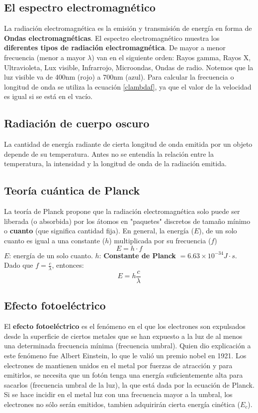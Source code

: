 \documentclass{article}
\begin{document}
\subsection{El espectro electromagnético}
La radiación electromagnética es la emisión y transmisión de energía en forma de \textbf{Ondas electromagnéticas}. El espectro electromagnético muestra los \textbf{diferentes tipos de radiación electromagnética}.
De mayor a menor frecuencia (menor a mayor $\lambda$) van en el siguiente orden: Rayos gamma, Rayos X, Ultravioleta, Lux visible, Infrarrojo, Microondas, Ondas de radio.
Notemos que la luz visible va de 400nm (rojo) a 700nm (azul).
Para calcular la frecuencia o longitud de onda se utiliza la ecuación \ref{clambdaf}, ya que el valor de la velocidad es igual si se está en el vacío.


\subsection{Radiación de cuerpo oscuro}
La cantidad de energía radiante de cierta longitud de onda emitida por un objeto depende de su temperatura. Antes no se entendía la relación entre la temperatura, la intensidad y la longitud de onda de la radiación emitida.

\subsection{Teoría cuántica de Planck}
La teoría de Planck propone que la radiación electromagnética solo puede ser liberada (o absorbida) por los átomos en "paquetes" discretos de tamaño mínimo o \textbf{cuanto} (que significa cantidad fija).
En general, la energía ($E$), de un solo cuanto es igual a una constante ($h$) multiplicada por su frecuencia ($f$)
\begin{equation}
    E=h\cdot f
\end{equation}
$E$: energía de un solo cuanto.
$h$: \textbf{Constante de Planck} $=6.63\times 10^{-34}J\cdot s$.
Dado que $f=\frac{c}{\lambda}$, entonces:
\begin{equation}
    E=h\frac{c}{\lambda}
\end{equation}

\subsection{Efecto fotoeléctrico}
El \textbf{efecto fotoeléctrico} es el fenómeno en el que los electrones son expulsados desde la superficie de ciertos metales que se han expuesto a la luz de al menos una determinada frecuencia mínima (frecuencia umbral). Quien dio explicación a este fenómeno fue Albert Einstein, lo que le valió un premio nobel en 1921.
Los electrones de mantienen unidos en el metal por fuerzas de atracción y para emitirlos, se necesita que un fotón tenga una energía suficientemente alta para sacarlos (frecuencia umbral de la luz), la que está dada por la ecuación de Planck.
Si se hace incidir en el metal luz con una frecuencia mayor a la umbral, los electrones no sólo serán emitidos, tambien adquirirán cierta energía cinética ($E_c$).
\end{document}
